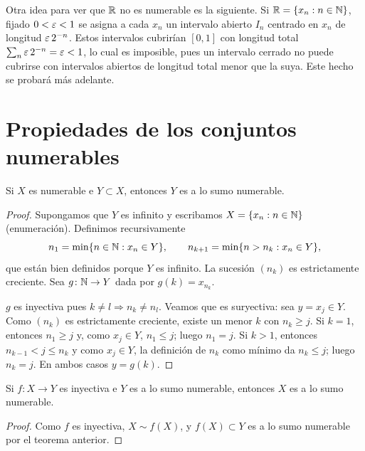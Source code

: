 \begin{note}
  Otra idea para ver que \(\mathbb{R}\) no es numerable es la siguiente. Si \(\mathbb{R} = \{x_n : n \in \mathbb{N}\}\), fijado \(0 < \varepsilon < 1\) se asigna a cada \(x_n\) un intervalo abierto \(I_n\) centrado en \(x_n\) de longitud \(\varepsilon\, 2^{-n}\). Estos intervalos cubrirían \([0, 1]\) con longitud total \(\sum_n \varepsilon\, 2^{-n} = \varepsilon < 1\), lo cual es imposible, pues un intervalo cerrado no puede cubrirse con intervalos abiertos de longitud total menor que la suya. Este hecho se probará más adelante.
\end{note}

\section{Propiedades de los conjuntos numerables}

\begin{theorem}
  Si \(X\) es numerable e \(Y \subset X\), entonces \(Y\) es a lo sumo numerable.
\end{theorem}

\begin{proof}
  Supongamos que \(Y\) es infinito y escribamos \(X = \{ x_n : n \in \mathbb{N} \}\) (enumeración). Definimos recursivamente
  \[
    n_1 = \min\{ n \in \mathbb{N} : x_n \in Y \}, \qquad n_{k+1} = \min\{ n > n_k : x_n \in Y \},
  \]
  que están bien definidos porque \(Y\) es infinito. La sucesión \((n_k)\) es estrictamente creciente. Sea \(g\colon \mathbb{N} \to Y\) dada por \(g(k) = x_{n_k}\).

  \(g\) es inyectiva pues \(k \neq l \Rightarrow n_k \neq n_l\). Veamos que es suryectiva: sea \(y = x_j \in Y\). Como \((n_k)\) es estrictamente creciente, existe un menor \(k\) con \(n_k \geq j\). Si \(k = 1\), entonces \(n_1 \geq j\) y, como \(x_j \in Y\), \(n_1 \leq j\); luego \(n_1 = j\). Si \(k > 1\), entonces \(n_{k-1} < j \leq n_k\) y como \(x_j \in Y\), la definición de \(n_k\) como mínimo da \(n_k \leq j\); luego \(n_k = j\). En ambos casos \(y = g(k)\).
\end{proof}

\begin{corollary}
  Si \(f\colon X \to Y\) es inyectiva e \(Y\) es a lo sumo numerable, entonces \(X\) es a lo sumo numerable.
\end{corollary}

\begin{proof}
  Como \(f\) es inyectiva, \(X \sim f(X)\), y \(f(X) \subset Y\) es a lo sumo numerable por el teorema anterior.
\end{proof}

